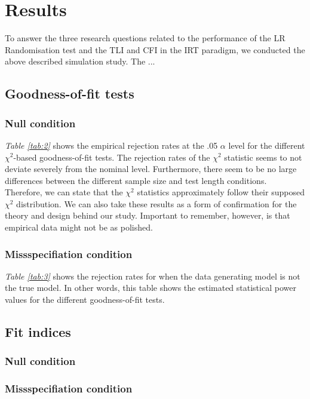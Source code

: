 \documentclass[Royal,sageapa,times,doublespace]{sagej}
\begin{document}
\section{Results}

To answer the three research questions related to the performance of the LR Randomisation test and the TLI and CFI in the IRT paradigm, we conducted the above described simulation study. The ...

\subsection{Goodness-of-fit tests}

\subsubsection{Null condition}

\textit{Table \ref{tab:2}} shows the empirical rejection rates at the .05 $\alpha$ level for the different $\chi^2$-based goodness-of-fit tests. The rejection rates of the $\chi^2$ statistic seems to not deviate severely from the nominal level. Furthermore, there seem to be no large differences between the different sample size and test length conditions. Therefore, we can  state that the $\chi^2$ statistics approximately follow their supposed $\chi^2$ distribution. We can also take these results as a form of confirmation for the theory and design behind our study. Important to remember, however, is that empirical data might not be as polished.

\subsubsection{Missspecifiation condition} 

\textit{Table \ref{tab:3}} shows the rejection rates for when the data generating model is not the true model. In other words, this table shows the estimated statistical power values for the different goodness-of-fit tests. 

\subsection{Fit indices}

\subsubsection{Null condition}

\subsubsection{Missspecifiation condition} 
\end{document}
